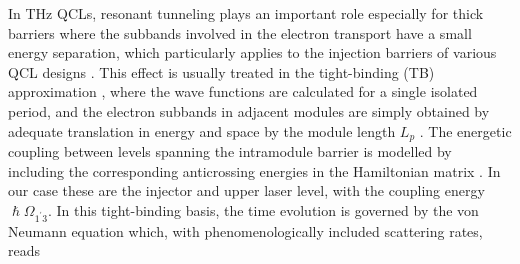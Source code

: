 \documentclass[10pt]{article}
\begin{document}
	In THz QCLs, resonant tunneling plays an important role especially for thick
	barriers where the subbands involved in the electron transport have a small
	energy separation, which particularly applies to the injection barriers of
	various QCL designs
	\cite{callebaut2005importance,kumar2009coherence,dupont2010simplified}. This
	effect is usually treated in the tight-binding (TB) approximation
	\cite{bastard1990wave}, where the wave functions are calculated for a single
	isolated period, and the electron subbands in adjacent modules are simply
	obtained by adequate translation in energy and space by the module length
	$L_{p}$ \cite{callebaut2005importance}. The energetic coupling between levels
	spanning the intramodule barrier is modelled by including the
	corresponding anticrossing energies in the Hamiltonian matrix
	\cite{kumar2009coherence,dupont2010simplified}. In our case these are the
	injector and upper laser level, with the coupling energy $\hslash\Omega
	_{1^{\prime}3}$. In this tight-binding basis, the time evolution is governed by the von Neumann equation which, with phenomenologically included scattering rates, reads
\end{document}
